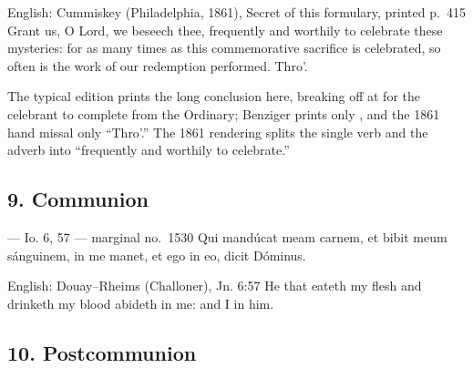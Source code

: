 \begin{namedtranslation}{English: Cummiskey (Philadelphia, 1861), Secret of this formulary, printed p.~415}
Grant us, O Lord, we beseech thee, frequently and worthily to celebrate these
mysteries: for as many times as this commemorative sacrifice is celebrated, so
often is the work of our redemption performed. Thro'.
\end{namedtranslation}

The typical edition prints the long conclusion here, breaking off at
 for the celebrant to complete from the Ordinary; Benziger
prints only , and the 1861 hand missal only ``Thro'.'' The
1861 rendering splits the single verb  and the adverb
 into ``frequently and worthily to celebrate.''


\elementguard
\subsection*{9. Communion }

\begin{appointedlatin}{ --- Io. 6, 57 --- marginal no.\ 1530}
Qui mandúcat meam carnem, et bibit meum sánguinem, in me manet, et ego in eo,
dicit Dóminus.
\end{appointedlatin}

\begin{namedtranslation}{English: Douay--Rheims (Challoner), Jn. 6:57}
He that eateth my flesh and drinketh my blood abideth in me: and I in him.
\end{namedtranslation}


\elementguard
\subsection*{10. Postcommunion }

